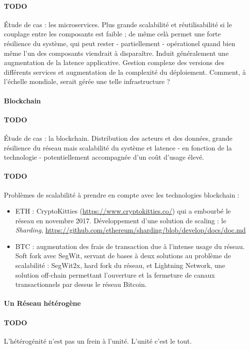 \paragraph{TODO} Étude de cas : les microservices. Plus grande scalabilité et réutilisabilité si le couplage entre les composants
est faible ; de même celà permet une forte résilience du système, qui peut rester - partiellement - opérationel quand
bien même l'un des composants viendrait à disparaître. Induit généralement une augmentation de la latence applicative.
Gestion complexe des versions des différents services et augmentation de la complexité du déploiement. Comment, à l'échelle
mondiale, serait gérée une telle infrastructure ?


\paragraph{Blockchain} \cite{Blockchain0} \cite{Blockchain1}

\paragraph{TODO} Étude de cas : la blockchain. Distribution des acteurs et des données, grande résilience du réseau mais scalabilité
du système et latence - en fonction de la technologie - potentiellement accompagnée d'un coût d'usage élevé.

\paragraph{TODO} Problèmes de scalabilité à prendre en compte avec les technologies blockchain :

\begin{itemize}
    \item ETH : CryptoKitties (\url{https://www.cryptokitties.co/}) qui a embourbé le réseau en novembre 2017. 
    Développement d'une solution de scaling : le \emph{Sharding}, \url{https://github.com/ethereum/sharding/blob/develop/docs/doc.md}
    \item BTC : augmentation des frais de transaction due à l'intense usage du réseau.
    Soft fork avec SegWit, servant de bases à deux solutions au problème de scalabilité : SegWit2x, hard fork du réseau,
    et Lightning Network, une solution off-chain permettant l'ouverture et la fermeture de canaux transactionnels par dessus
    le réseau Bitcoin.
\end{itemize}


\paragraph{Un Réseau hétérogène}

\paragraph{TODO} L'hétérogénité n'est pas un frein à l'unité. L'unité c'est le tout.

